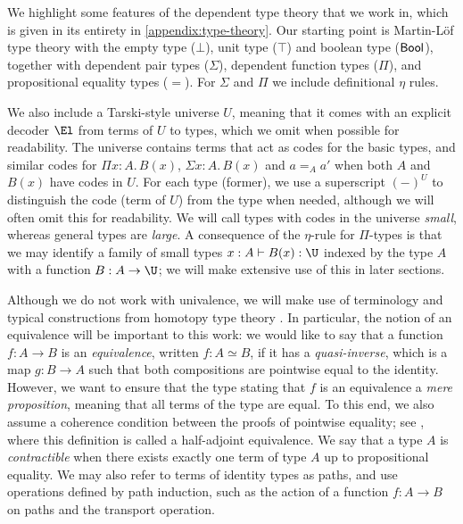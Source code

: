 \newenvironment{bprooftree}
{\leavevmode\hbox\bgroup}
{\DisplayProof\egroup}

We highlight some features of the dependent type theory that we work in, which is given in its entirety in \autoref{appendix:type-theory}. 
Our starting point is Martin-L\"of type theory with the empty type (\(\bot\)), unit type (\(\top\)) and boolean type (\(\sf{Bool}\)), together with dependent pair types (\(\Sigma\)), dependent function types (\(\Pi\)), and propositional equality types (\(=\)).
For \(\Sigma\) and \(\Pi\) we include definitional \(\eta\) rules.

We also include a Tarski-style universe \(U\), meaning that it comes with an explicit decoder \( \El \) from terms of \(U\) to types, which we omit when possible for readability.
The universe contains terms that act as codes for the basic types, and similar codes for \(\Pi x:A.\,B(x)\), \(\Sigma x:A.\,B(x)\) and \(a=_Aa'\) when both \(A\) and \(B(x)\) have codes in \(U\).
For each type (former), we use a superscript \((-)^U\) to distinguish the code (term of \(U\)) from the type when needed, although we will often omit this for readability.
We will call types with codes in the universe \emph{small}, whereas general types are \emph{large}.
A consequence of the $\eta$-rule for $\Pi$-types is that we may identify a family of small types $x:A\vdash B(x):\U$ indexed by the type $A$ with a function $B:A\to\U$; we will make extensive use of this in later sections.

Although we do not work with univalence, we will make use of terminology and typical constructions from homotopy type theory \cite{hottbook}.
In particular, the notion of an equivalence will be important to this work: we would like to say that a function \(f:A\to B\) is an \emph{equivalence}, written \(f:A\simeq B\), if it has a \emph{quasi-inverse}, which is a map \(g:B\to A\) such that both compositions are pointwise equal to the identity. However, we want to ensure that the type stating that \(f\) is an equivalence a \emph{mere proposition}, meaning that all terms of the type are equal. To this end, we also assume a coherence condition between the proofs of pointwise equality; see \cite[Definition 4.2.1]{hottbook}, where this definition is called a half-adjoint equivalence. We say that a type $A$ is \emph{contractible} when there exists exactly one term of type $A$ up to propositional equality.
We may also refer to terms of identity types as paths, and use operations defined by path induction, such as the action of a function \( f : A \to B \) on paths and the transport operation.

